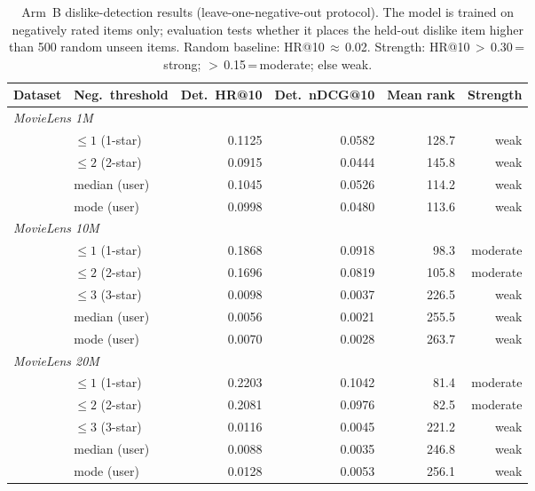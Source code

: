 \begin{table}[ht]
\centering
\caption{Arm~B dislike-detection results (leave-one-negative-out protocol).
  The model is trained on negatively rated items only; evaluation tests whether
  it places the held-out dislike item higher than 500 random unseen items.
  Random baseline: HR@10\,$\approx$\,0.02.
  Strength: HR@10\,$>$\,0.30\,=\,strong; $>$\,0.15\,=\,moderate; else weak.}
\label{tab:arm_b_detection}
\begin{tabular}{llrrrr}
\toprule
Dataset       & Neg.\ threshold & Det.\ HR@10 & Det.\ nDCG@10 & Mean rank & Strength \\
\midrule
\multicolumn{6}{l}{\textit{MovieLens 1M}} \\
              & $\leq1$ (1-star)  & 0.1125 & 0.0582 & 128.7 & weak \\
              & $\leq2$ (2-star)  & 0.0915 & 0.0444 & 145.8 & weak \\
              & median (user)     & 0.1045 & 0.0526 & 114.2 & weak \\
              & mode (user)       & 0.0998 & 0.0480 & 113.6 & weak \\
\midrule
\multicolumn{6}{l}{\textit{MovieLens 10M}} \\
              & $\leq1$ (1-star)  & 0.1868 & 0.0918 &  98.3 & moderate \\
              & $\leq2$ (2-star)  & 0.1696 & 0.0819 & 105.8 & moderate \\
              & $\leq3$ (3-star)  & 0.0098 & 0.0037 & 226.5 & weak \\
              & median (user)     & 0.0056 & 0.0021 & 255.5 & weak \\
              & mode (user)       & 0.0070 & 0.0028 & 263.7 & weak \\
\midrule
\multicolumn{6}{l}{\textit{MovieLens 20M}} \\
              & $\leq1$ (1-star)  & 0.2203 & 0.1042 &  81.4 & moderate \\
              & $\leq2$ (2-star)  & 0.2081 & 0.0976 &  82.5 & moderate \\
              & $\leq3$ (3-star)  & 0.0116 & 0.0045 & 221.2 & weak \\
              & median (user)     & 0.0088 & 0.0035 & 246.8 & weak \\
              & mode (user)       & 0.0128 & 0.0053 & 256.1 & weak \\

\end{tabular}
\end{table}
